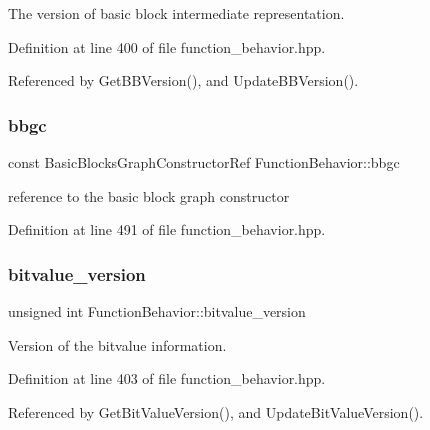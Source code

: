 The version of basic block intermediate representation. 



Definition at line 400 of file function\+\_\+behavior.\+hpp.



Referenced by Get\+B\+B\+Version(), and Update\+B\+B\+Version().

\mbox{\label{classFunctionBehavior_a7fb64321932bbdad8860fe017e6f64b5}} 
\subsubsection{\texorpdfstring{bbgc}{bbgc}}
{\footnotesize\ttfamily const Basic\+Blocks\+Graph\+Constructor\+Ref Function\+Behavior\+::bbgc}



reference to the basic block graph constructor 



Definition at line 491 of file function\+\_\+behavior.\+hpp.

\mbox{\label{classFunctionBehavior_aa15033642ac2f45870432b2ca8fae3de}} 
\subsubsection{\texorpdfstring{bitvalue\+\_\+version}{bitvalue\_version}}
{\footnotesize\ttfamily unsigned int Function\+Behavior\+::bitvalue\+\_\+version\hspace{0.3cm}{\ttfamily [private]}}



Version of the bitvalue information. 



Definition at line 403 of file function\+\_\+behavior.\+hpp.



Referenced by Get\+Bit\+Value\+Version(), and Update\+Bit\+Value\+Version().

\mbox{\label{classFunctionBehavior_adf8e6f930dc469fd3de3c56b731d4a0e}} 
